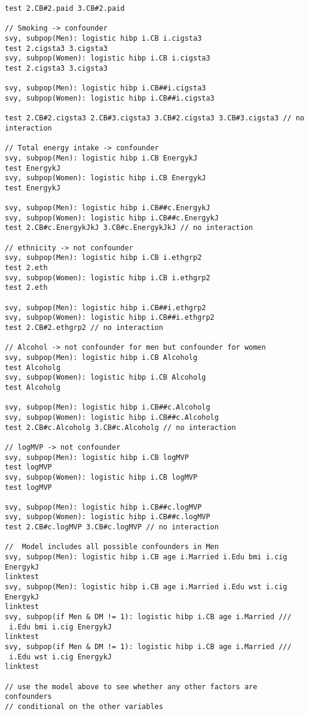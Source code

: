 \begin{verbatim}
test 2.CB#2.paid 3.CB#2.paid

// Smoking -> confounder
svy, subpop(Men): logistic hibp i.CB i.cigsta3
test 2.cigsta3 3.cigsta3
svy, subpop(Women): logistic hibp i.CB i.cigsta3
test 2.cigsta3 3.cigsta3

svy, subpop(Men): logistic hibp i.CB##i.cigsta3
svy, subpop(Women): logistic hibp i.CB##i.cigsta3

test 2.CB#2.cigsta3 2.CB#3.cigsta3 3.CB#2.cigsta3 3.CB#3.cigsta3 // no interaction

// Total energy intake -> confounder
svy, subpop(Men): logistic hibp i.CB EnergykJ
test EnergykJ
svy, subpop(Women): logistic hibp i.CB EnergykJ
test EnergykJ

svy, subpop(Men): logistic hibp i.CB##c.EnergykJ
svy, subpop(Women): logistic hibp i.CB##c.EnergykJ
test 2.CB#c.EnergykJkJ 3.CB#c.EnergykJkJ // no interaction

// ethnicity -> not confounder
svy, subpop(Men): logistic hibp i.CB i.ethgrp2
test 2.eth
svy, subpop(Women): logistic hibp i.CB i.ethgrp2
test 2.eth

svy, subpop(Men): logistic hibp i.CB##i.ethgrp2
svy, subpop(Women): logistic hibp i.CB##i.ethgrp2
test 2.CB#2.ethgrp2 // no interaction

// Alcohol -> not confounder for men but confounder for women
svy, subpop(Men): logistic hibp i.CB Alcoholg
test Alcoholg
svy, subpop(Women): logistic hibp i.CB Alcoholg
test Alcoholg

svy, subpop(Men): logistic hibp i.CB##c.Alcoholg
svy, subpop(Women): logistic hibp i.CB##c.Alcoholg
test 2.CB#c.Alcoholg 3.CB#c.Alcoholg // no interaction

// logMVP -> not confounder 
svy, subpop(Men): logistic hibp i.CB logMVP
test logMVP
svy, subpop(Women): logistic hibp i.CB logMVP
test logMVP

svy, subpop(Men): logistic hibp i.CB##c.logMVP
svy, subpop(Women): logistic hibp i.CB##c.logMVP
test 2.CB#c.logMVP 3.CB#c.logMVP // no interaction

//  Model includes all possible confounders in Men
svy, subpop(Men): logistic hibp i.CB age i.Married i.Edu bmi i.cig EnergykJ 
linktest
svy, subpop(Men): logistic hibp i.CB age i.Married i.Edu wst i.cig EnergykJ 
linktest
svy, subpop(if Men & DM != 1): logistic hibp i.CB age i.Married ///
 i.Edu bmi i.cig EnergykJ 
linktest
svy, subpop(if Men & DM != 1): logistic hibp i.CB age i.Married ///
 i.Edu wst i.cig EnergykJ 
linktest

// use the model above to see whether any other factors are confounders 
// conditional on the other variables 


\end{verbatim}

